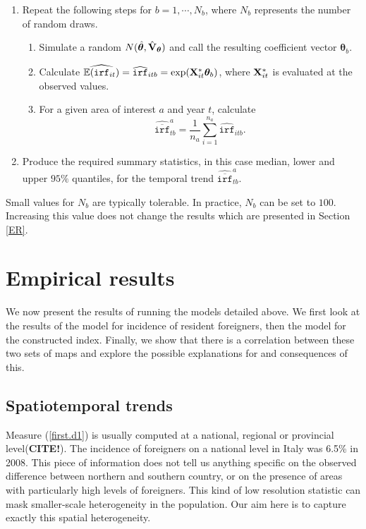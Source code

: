 \documentclass[10pt]{article}
\newcommand{\E}{\mathbb{E}}
\newcommand{\X}{{\bf X}}
\theoremstyle{definition}
\theoremstyle{plain}
\begin{document}
\begin{enumerate}
	\item Repeat the following steps for $b=1,\cdots,N_b$, where $N_b$ represents the number of random draws. 
	   \begin{enumerate}
	      \item Simulate a random $N(\hat{\bm\theta}, \hat{{\bf V}}_{\bm\theta} )$ and call the resulting coefficient vector $\bm\theta_b$.
	      \item Calculate $\widehat{\E(\texttt{irf}_{it})}=\widehat{\texttt{irf}}_{itb}=\exp(\X^*_{it}\bm\theta_b)$, where $\X^*_{it}$ is evaluated at the observed values. 
	      \item For a given area of interest $a$ and year $t$, calculate
	      $$\widehat{\overline{\texttt{irf}}}_{tb}^a=\frac{1}{n_a}\sum_{i=1}^{n_a} \widehat{\texttt{irf}}_{itb}.$$    
	   \end{enumerate}
	\item Produce the required summary statistics, in this case median, lower and upper $95\%$ quantiles, for the temporal trend $\widehat{\overline{\texttt{irf}}}_{tb}^a$.
\end{enumerate}
Small values for $N_b$ are typically tolerable. In practice, $N_b$ can be set to $100$. Increasing this value does not change the results which are presented in Section \ref{ER}.
 

\section{Empirical results \label{ER}}

We now present the results of running the models detailed above. We first look at the results of the model for incidence of resident foreigners, then the model for the constructed index. Finally, we show that there is a correlation between these two sets of maps and explore the possible explanations for and consequences of this.

\subsection{Spatiotemporal trends \label{STT}}

Measure (\ref{first.d1}) is usually computed at a national, regional or provincial level(\textbf{CITE!}). The incidence of foreigners on a national level in Italy was 6.5\% in 2008. This piece of information does not tell us anything specific on the observed difference between northern and southern country, or on the presence of areas with particularly high levels of foreigners. This kind of  low resolution statistic can mask smaller-scale heterogeneity in the population. Our aim here is to capture exactly this spatial heterogeneity.
\end{document}
